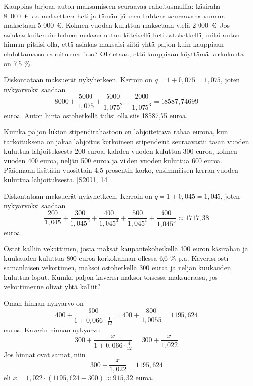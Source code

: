\documentclass[a4paper,10pt]{article}\usepackage[]{graphicx}\usepackage[]{color}
\begin{document}
\begin{question} Kauppias tarjoaa auton maksamiseen seuraavaa rahoitusmallia: käsiraha 8~000~\euro \ on maksettava heti ja tämän
jälkeen kahtena seuraavana vuonna maksetaan 5 000~\euro. Kolmen vuoden kuluttua maksetaan vielä 2 000~\euro.
Jos asiakas kuitenkin haluaa maksaa auton käteisellä heti ostohetkellä, mikä auton hinnan pitäisi olla, että asiakas
maksaisi siitä yhtä paljon kuin kauppiaan ehdottamassa rahoitusmallissa? Oletetaan, että kauppiaan käyttämä
korkokanta on 7{,}5 \%.
\end{question}\begin{solution}
    Diskontataan maksuerät nykyhetkeen. Kerroin on \(q= 1+0,075 = 1,075\), joten nykyarvoksi saadaan
    \[
        8000 + \frac{5000}{1,075} + \frac{5000}{1,075^2} + \frac{2000}{1,075^3} = 18587,74699
    \]
    euroa. Auton hinta ostohetkellä tulisi olla siis 18587,75 euroa.
\end{solution}


\begin{question} Kuinka paljon lukion stipendirahastoon on lahjoitettava rahaa eurona, kun tarkoituksena on jakaa lahjoitus korkoineen
stipendeinä seuraavasti: tasan vuoden kuluttua lahjoituksesta 200 euroa, kahden vuoden kuluttua 300 euroa,
kolmen vuoden 400 euroa, neljän 500 euroa ja viiden vuoden kuluttua 600 euroa. Pääomaan lisätään vuosittain 4,5 prosentin korko,
ensimmäisen kerran vuoden kuluttua lahjoituksesta. [S2001, 14]
\end{question}\begin{solution}
    Diskontataan maksuerät nykyhetkeen. Kerroin on \(q= 1+0,045 = 1,045\), joten nykyarvoksi saadaan
    \[
        \frac{200}{1,045} + \frac{300}{1,045^2} + \frac{400}{1,045^3} + \frac{500}{1,045^4} + \frac{600}{1,045^5} \approx 1717,38
    \]
    euroa.
\end{solution}

\begin{question} Ostat kalliin vekottimen, josta maksat kaupantekohetkellä 400 euron käsirahan ja kuukauden kuluttua 800 euroa korkokannan ollessa 6{,}6 \% p.a.
Kaverisi osti samanlaisen vekottimen, maksoi ostohetkellä 300 euroa ja neljän kuukauden kuluttua loput.
Kuinka paljon kaverisi maksoi toisessa maksuerässä, jos vekottimenne olivat yhtä kalliit?
\end{question}\begin{solution}
    Oman hinnan nykyarvo on
    \[
        400 + \frac{800}{1+0,066\cdot\frac{1}{12}} = 400 + \frac{800}{1,0055} = 1195,624
    \]
    euroa. Kaverin hinnan nykyarvo
    \[
        300 + \frac{x}{1+0,066\cdot\frac{4}{12}} = 300 + \frac{x}{1,022}
    \]
    Jos hinnat ovat samat, niin
    \[
        300 + \frac{x}{1,022} =  1195,624
    \]
    eli \( x = 1,022\cdot(1195,624-300)\approx 915,32\) euroa.
\end{solution}
\end{document}
